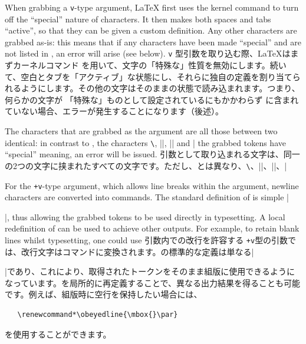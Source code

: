 \documentclass{ltxguide}
\newcommand\jpnewline{\vspace{3pt}\newline}
\DeclareRobustCommand{\jpemph}[1]{%
  \underLine{#1}%
}
\DeclareRobustCommand{\jpquote}[1]{「#1」}
\begin{document}
When grabbing a \texttt{v}-type argument, \LaTeX{} first uses the kernel
command  to turn off the \enquote{special} nature of characters.
It then makes both spaces and tabs \enquote{active}, so that they can be given
a custom definition. Any other characters are grabbed as-is: this means that if
any characters have been made \enquote{special} and are not listed in
, an error will arise (see below).
\jpnewline
\texttt{v} 型引数を取り込む際、\LaTeX{}はまずカーネルコマンド を用いて、文字の\jpquote{特殊な}性質を無効にします。続いて、空白とタブを\jpquote{アクティブ}な状態にし、それらに独自の定義を割り当てられるようにします。その他の文字はそのままの状態で読み込まれます。つまり、何らかの文字が \jpquote{特殊な}ものとして設定されているにもかかわらず に含まれていない場合、エラーが発生することになります（後述）。

The characters that are grabbed as the argument are all those between two
identical: in contrast to , the characters \texttt{\textbackslash},
|{|, |}| and |%
the grabbed tokens have \enquote{special} meaning, an error will be issued.
\jpnewline
引数として取り込まれる文字は、同一の2つの文字に挟まれたすべての文字です。ただし、とは異なり、\texttt{\textbackslash}、|{|、|}|、|%

For the \texttt{+v}-type argument, which allows line breaks within the
argument, newline characters are converted into  commands. The
standard definition of  is simple |\par|, thus allowing the
grabbed tokens to be used directly in typesetting. A local redefinition of
 can be used to achieve other outputs. For example, to retain
blank lines whilst typesetting, one could use
\jpnewline
引数内での改行を許容する \texttt{+v}型の引数では、改行文字はコマンドに変換されます。の標準的な定義は単なる|\par|であり、これにより、取得されたトークンをそのまま組版に使用できるようになっています。を局所的に再定義することで、異なる出力結果を得ることも可能です。例えば、組版時に空行を保持したい場合には、
\begin{verbatim}
   \renewcommand*\obeyedline{\mbox{}\par}
\end{verbatim}
を使用することができます。
\end{document}
